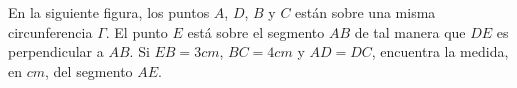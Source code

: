 En la siguiente figura, los puntos $A$, $D$, $B$ y $C$ están sobre una misma circunferencia $\Gamma$. El punto $E$ está sobre el segmento $AB$ de tal manera que $DE$ es perpendicular a $AB$. Si $EB = 3 cm$, $BC = 4 cm$ y $AD = DC$, encuentra la medida, en $cm$, del segmento $AE$.